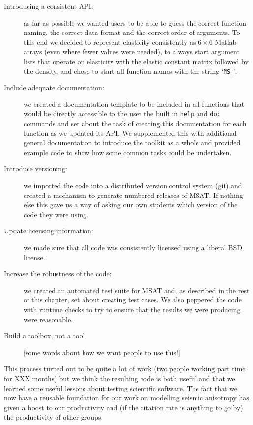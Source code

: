 \documentclass[11pt, oneside]{article}   	%
\begin{document}
\begin{description}

\item[Introducing a consistent API:] as far as possible we wanted users 
to be able to guess the correct function naming, the correct data format 
and the correct order of arguments. To this end we decided to represent 
elasticity consistently as $6\times6$ Matlab arrays (even where fewer
values were needed), to always start argument lists that operate on 
elasticity with the elastic constant matrix followed by the density, and
chose to start all function names with the string `\texttt{MS\_}'.

\item[Include adequate documentation:] we created a documentation template
to be included in all functions that would be directly accessible to the user
the built in \texttt{help} and \texttt{doc} commands and set about the task of
creating this documentation for each function as we updated its API. We 
supplemented this with additional general documentation to introduce 
the toolkit as a whole and provided example code to show how
some common tasks could be undertaken.

\item[Introduce versioning:] we imported the code into a distributed version
control system (git) and created a mechanism to generate numbered 
releases of MSAT. If nothing else this gave us a way of asking our own students
which version of the code they were using.

\item[Update licensing information:] we made sure that all code was consistently 
licensed using a liberal BSD license.

\item[Increase the robustness of the code:] we created an automated test suite 
for MSAT and, as described in the rest of this chapter, set about creating test 
cases. We also peppered the code with runtime checks to try to ensure that
the results we were producing were reasonable. 

\item[Build a toolbox, not a tool] [some words about how we want people to 
use this!]

\end{description}

This process turned out to be quite a lot of work (two people working part time
for XXX months) but we think the resulting code is both useful and that we 
learned some useful lessons about testing scientific software. The fact that 
we now have a reusable foundation for our work on modelling seismic  
anisotropy has given a boost to our productivity and 
(if the citation rate is anything to go by) the productivity of other groups.
\end{document}
